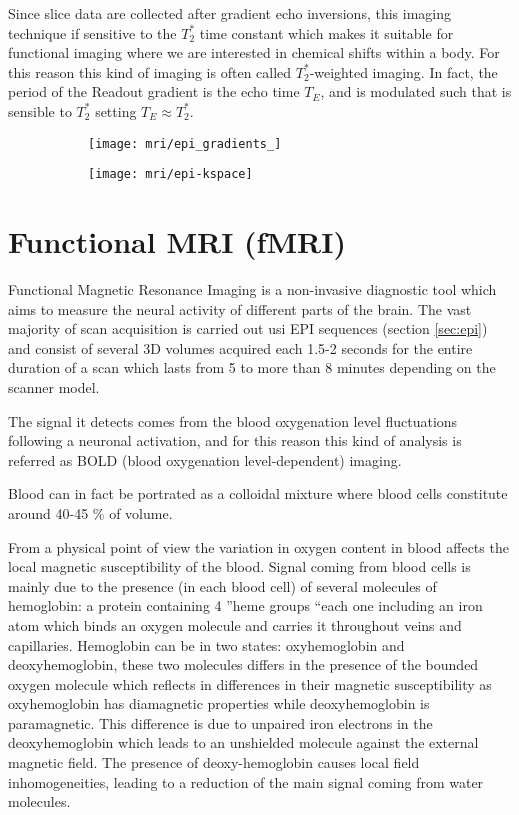 \documentclass[10pt]{report}
\begin{document}
Since slice data are collected after gradient echo inversions, this imaging technique if sensitive to the $T_2^*$ time constant which makes it suitable for functional imaging where we are interested in chemical shifts within a body. For this reason this kind of imaging is often called $T_2^*$-weighted imaging.
In fact, the period of the Readout gradient is the echo time $T_E$, and is modulated such that is sensible to $T_2^{\ast}$ setting $T_E \approx T_2^{\ast}$.




\begin{figure}
\begin{subfigure}{0.5\textwidth}
\texttt{[image: mri/epi\_gradients\_]}
\caption{}
\label{fig:epi_gradients}
\end{subfigure}
\begin{subfigure}{0.5\textwidth}
\texttt{[image: mri/epi-kspace]}
\caption{}
\label{fig:epi_kspace}
\end{subfigure}
\caption{}
\label{fig:epi}
\end{figure}



\section{Functional MRI (fMRI)}\label{sec:fmri}

Functional Magnetic Resonance Imaging is a non-invasive diagnostic tool which aims to measure the neural activity of different parts of the brain.
The vast majority of scan acquisition is carried out usi EPI sequences (section \ref{sec:epi}) and consist of several 3D volumes acquired each 1.5-2 seconds for the entire duration of a scan which lasts from 5 to more than 8 minutes depending on the scanner model.


The signal it detects comes from the blood oxygenation level fluctuations following a neuronal activation, and for this reason this kind of analysis is referred as BOLD (blood oxygenation level-dependent) imaging.

Blood can in fact be portrated as a colloidal mixture where blood cells constitute around 40-45 \% of volume. \cite{brown-2014}

From a physical point of view the variation in oxygen content in blood affects the local magnetic susceptibility of the blood.
Signal coming from blood cells is mainly due to the presence (in each blood cell) of several molecules of hemoglobin: a protein containing 4 \textquotedblright heme groups \textquotedblleft each one including an iron atom which binds an oxygen molecule and carries it throughout veins and capillaries.
Hemoglobin can be in two states: oxyhemoglobin and deoxyhemoglobin, these two molecules differs in the presence of the bounded oxygen molecule which reflects in differences in their magnetic susceptibility as oxyhemoglobin has diamagnetic properties while deoxyhemoglobin is paramagnetic.
This difference is due to unpaired iron electrons in the deoxyhemoglobin which leads to an unshielded molecule against the external magnetic field.
The presence of deoxy-hemoglobin causes local field inhomogeneities, leading to a reduction of the main signal coming from water molecules.
\end{document}
